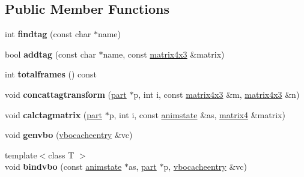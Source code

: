 \subsection*{Public Member Functions}
\begin{DoxyCompactItemize}
\item 
\mbox{\label{structvertmodel_1_1vertmeshgroup_aa2b47affbbe13007eed582d28a7f5dfb}} 
int {\bfseries findtag} (const char $\ast$name)
\item 
\mbox{\label{structvertmodel_1_1vertmeshgroup_a1a7df1852ea2aa88ca9a4cd5bf58c067}} 
bool {\bfseries addtag} (const char $\ast$name, const \hyperlink{structmatrix4x3}{matrix4x3} \&matrix)
\item 
\mbox{\label{structvertmodel_1_1vertmeshgroup_a9c3f0682fe894a9f2217a2e67d3eba40}} 
int {\bfseries totalframes} () const
\item 
\mbox{\label{structvertmodel_1_1vertmeshgroup_a8b1c911f823a1547b0e83b102acefba3}} 
void {\bfseries concattagtransform} (\hyperlink{structanimmodel_1_1part}{part} $\ast$p, int i, const \hyperlink{structmatrix4x3}{matrix4x3} \&m, \hyperlink{structmatrix4x3}{matrix4x3} \&n)
\item 
\mbox{\label{structvertmodel_1_1vertmeshgroup_a45dff7dbf336f11aef2c08c4d93f789b}} 
void {\bfseries calctagmatrix} (\hyperlink{structanimmodel_1_1part}{part} $\ast$p, int i, const \hyperlink{structanimmodel_1_1animstate}{animstate} \&as, \hyperlink{structmatrix4}{matrix4} \&matrix)
\item 
\mbox{\label{structvertmodel_1_1vertmeshgroup_affc3003daa9192e96fcd7c846227cf72}} 
void {\bfseries genvbo} (\hyperlink{structvertmodel_1_1vbocacheentry}{vbocacheentry} \&vc)
\item 
\mbox{\label{structvertmodel_1_1vertmeshgroup_a9f18b3ceb7cce1993e071c36fd6a497e}} 
{\footnotesize template$<$class T $>$ }\\void {\bfseries bindvbo} (const \hyperlink{structanimmodel_1_1animstate}{animstate} $\ast$as, \hyperlink{structanimmodel_1_1part}{part} $\ast$p, \hyperlink{structvertmodel_1_1vbocacheentry}{vbocacheentry} \&vc)

\end{DoxyCompactItemize}
